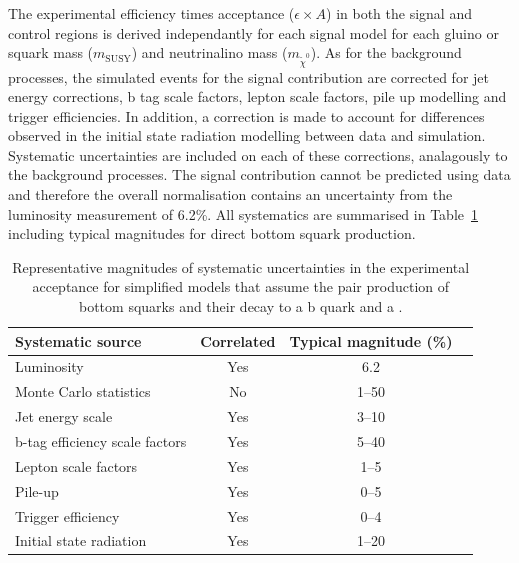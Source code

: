 The experimental efficiency times acceptance ($\epsilon \times A$) in both the signal and 
control regions is derived independantly for each signal model for each gluino or squark 
mass ($m_{\text{SUSY}}$) and neutrinalino mass ($m_{\tilde{\chi}^{0}}$). As for the 
background processes, the simulated events for the signal contribution are corrected for 
jet energy corrections, b tag scale factors, lepton scale factors, pile up modelling and trigger efficiencies.
In addition, a correction is made to account for differences observed in the initial 
state radiation modelling between data and simulation. Systematic uncertainties are included 
on each of these corrections, analagously to the background processes. The signal contribution
cannot be predicted using data and therefore the overall normalisation contains an uncertainty
from the luminosity measurement of 6.2\%. All systematics are summarised
in Table~\ref{tab:signal_systs} including typical magnitudes for direct bottom squark production.

\begin{table}[h!]
  \caption{
    Representative magnitudes of systematic uncertainties in the
    experimental acceptance for simplified models that assume the 
    pair production of bottom squarks and their decay to a b
    quark and a \chiz.}  
  \label{tab:signal_systs}
  \centering
  \footnotesize
  \begin{tabular}{ lccc }
    \hline
    Systematic source\T\B          & Correlated & Typical magnitude (\%) \\
    \hline
    Luminosity\T                   & Yes        & 6.2                    \\
    Monte Carlo statistics         & No         & 1--50                  \\
    Jet energy scale               & Yes        & 3--10                  \\
    b-tag efficiency scale factors & Yes        & 5--40                  \\
    Lepton scale factors           & Yes        & 1--5                   \\
    Pile-up                        & Yes        & 0--5                   \\
    Trigger efficiency             & Yes        & 0--4                   \\
    Initial state radiation        & Yes        & 1--20                  \\
    \hline
  \end{tabular}
\end{table}


